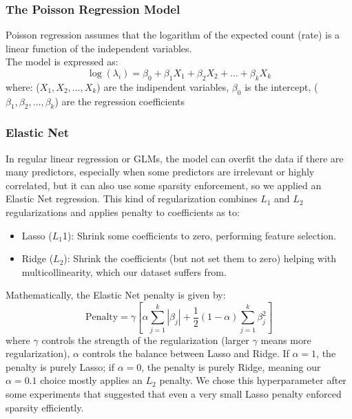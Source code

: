 \documentclass[a4paper, 9pt]{article}
\begin{document}
\begin{multicols}{2}
\subsubsection*{The Poisson Regression Model}
Poisson regression assumes that the logarithm of the expected count (rate) is a linear function of the independent variables.\\
The model is expressed as:
\begin{equation}
\log(\lambda_i)=\beta_0+\beta_1X_1+\beta_2X_2+\dots+\beta_kX_k
\end{equation}
where: ($X_1, X_2,\dots,X_k$) are the indipendent variables, $\beta_0$ is the intercept, ($\beta_1,\beta_2, \dots, \beta_k$) are the regression coefficients
\subsubsection*{Elastic Net}
In regular linear regression or GLMs, the model can overfit the data if there are many predictors, especially when some predictors are irrelevant or highly correlated, but it can also use some sparsity enforcement, so we applied an Elastic Net regression. This kind of regularization combines $L_1$ and $L_2$ regularizations and applies penalty to coefficients as to: 
\begin{itemize}
\item Lasso ($L_1$1): Shrink some coefficients to zero, performing feature selection.
\item Ridge ($L_2$): Shrink the coefficients (but not set them to zero) helping with multicollinearity, which our dataset suffers from.
\end{itemize}
Mathematically, the Elastic Net penalty is given by:
\begin{equation}
\text{Penalty}= \gamma \left[\alpha \sum_{j=1}^k|\beta_j| + \frac{1}{2}(1-\alpha)\sum_{j=1}^k\beta_{j}^{2} \right]
\end{equation} 
where $\gamma$ controls the strength of the regularization (larger $\gamma$ means more regularization), $\alpha$ controls the balance between Lasso and Ridge. If $\alpha=1$, the penalty is purely Lasso; if $\alpha=0$, the penalty is purely Ridge, meaning our $\alpha = 0.1$ choice mostly applies an $L_2$ penalty. We chose this hyperparameter after some experiments that suggested that even a very small Lasso penalty enforced sparsity efficiently.

\end{multicols}
\end{document}
